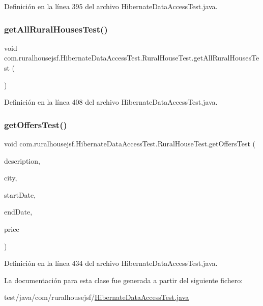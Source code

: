 Definición en la línea 395 del archivo Hibernate\+Data\+Access\+Test.\+java.

\mbox{\label{a00284_abe3f39b2ef888c3f2b16d399c3d01f66}} 
\subsubsection{\texorpdfstring{getAllRuralHousesTest()}{getAllRuralHousesTest()}}
{\footnotesize\ttfamily void com.\+ruralhousejsf.\+Hibernate\+Data\+Access\+Test.\+Rural\+House\+Test.\+get\+All\+Rural\+Houses\+Test (\begin{DoxyParamCaption}{ }\end{DoxyParamCaption})\hspace{0.3cm}{\ttfamily [package]}}



Definición en la línea 408 del archivo Hibernate\+Data\+Access\+Test.\+java.

\mbox{\label{a00284_a1f307f98016263fa520eefc8520ed5d2}} 
\subsubsection{\texorpdfstring{getOffersTest()}{getOffersTest()}}
{\footnotesize\ttfamily void com.\+ruralhousejsf.\+Hibernate\+Data\+Access\+Test.\+Rural\+House\+Test.\+get\+Offers\+Test (\begin{DoxyParamCaption}\item[{String}]{description,  }\item[{String}]{city,  }\item[{@Java\+Time\+Conversion\+Pattern(\char`\"{}dd/MM/yyyy\char`\"{}) Local\+Date}]{start\+Date,  }\item[{@Java\+Time\+Conversion\+Pattern(\char`\"{}dd/MM/yyyy\char`\"{}) Local\+Date}]{end\+Date,  }\item[{double}]{price }\end{DoxyParamCaption})\hspace{0.3cm}{\ttfamily [package]}}



Definición en la línea 434 del archivo Hibernate\+Data\+Access\+Test.\+java.



La documentación para esta clase fue generada a partir del siguiente fichero\+:\begin{DoxyCompactItemize}
\item 
test/java/com/ruralhousejsf/\mbox{\hyperlink{a00101}{Hibernate\+Data\+Access\+Test.\+java}}\end{DoxyCompactItemize}
